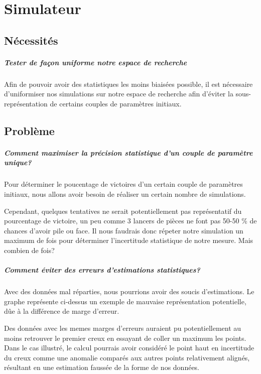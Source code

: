 \chapter{Simulateur}

	\section{Nécessités}
	
		\paragraph{Tester de façon uniforme notre espace de recherche}
		Afin de pouvoir avoir des statistiques les moins biaisées possible, il est nécessaire d'uniformiser nos simulations sur notre espace de recherche afin d'éviter la sous-représentation de certains couples de paramètres initiaux.
 
 		
		
	\section{Problème}
		\paragraph{Comment maximiser la précision statistique d'un couple de paramètre unique?}
		Pour déterminer le poucentage de victoires d'un certain couple de paramètres initiaux, nous allons avoir besoin de réaliser un certain nombre de simulations. 
		
		
		Cependant, quelques tentatives ne serait potentiellement pas représentatif du pourcentage de victoire, un peu comme 3 lancers de pièces ne font pas 50-50 \% de chances d'avoir pile ou face.
		Il nous faudrais donc répeter notre simulation un maximum de fois pour déterminer l'incertitude statistique de notre mesure. Mais combien de fois?
		\paragraph{Comment éviter des erreurs d'estimations statistiques?}
		Avec des données mal réparties, nous pourrions avoir des soucis d'estimations. 
		Le graphe représente ci-dessus un exemple de mauvaise représentation potentielle, dûe à la différence de marge d'erreur.
		
		Des données avec les memes marges d'erreurs auraient pu potentiellement au moins retrouver le premier creux en essayant de coller un maximum les points.
		Dans le cas illustré, le calcul pourrais avoir considéré le point haut en incertitude du creux comme une anomalie comparés aux autres points relativement alignés, résultant en une estimation faussée de la forme de nos données.
		
